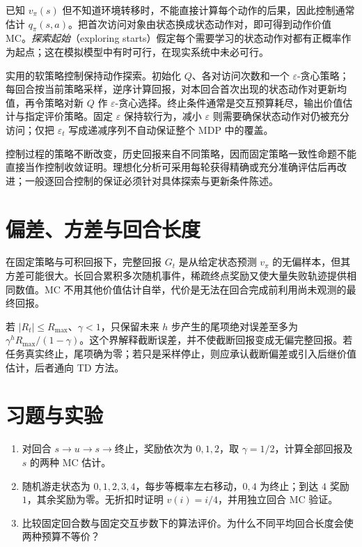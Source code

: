 已知 $v_\pi(s)$ 但不知道环境转移时，不能直接计算每个动作的后果，因此控制通常估计 $q_\pi(s,a)$。把首次访问对象由状态换成状态动作对，即可得到动作价值 MC。\emph{探索起始}（exploring starts）假定每个需要学习的状态动作对都有正概率作为起点；这在模拟模型中有时可行，在现实系统中未必可行。

实用的软策略控制保持动作探索。初始化 $Q$、各对访问次数和一个 $\varepsilon$-贪心策略；每回合按当前策略采样，逆序计算回报，对本回合首次出现的状态动作对更新均值，再令策略对新 $Q$ 作 $\varepsilon$-贪心选择。终止条件通常是交互预算耗尽，输出价值估计与指定评价策略。固定 $\varepsilon$ 保持软行为，减小 $\varepsilon$ 则需要确保状态动作对仍被充分访问；仅把 $\varepsilon_t$ 写成递减序列不自动保证整个 MDP 中的覆盖。

控制过程的策略不断改变，历史回报来自不同策略，因而固定策略一致性命题不能直接当作控制收敛证明。理想化分析可采用每轮获得精确或充分准确评估后再改进；一般逐回合控制的保证必须针对具体探索与更新条件陈述。

\section{偏差、方差与回合长度}

在固定策略与可积回报下，完整回报 $G_t$ 是从给定状态预测 $v_\pi$ 的无偏样本，但其方差可能很大。长回合累积多次随机事件，稀疏终点奖励又使大量失败轨迹提供相同数值。MC 不用其他价值估计自举，代价是无法在回合完成前利用尚未观测的最终回报。

若 $|R_t|\leq R_{\max}$、$\gamma<1$，只保留未来 $h$ 步产生的尾项绝对误差至多为 $\gamma^hR_{\max}/(1-\gamma)$。这个界解释截断误差，并不使截断回报变成无偏完整回报。若任务真实终止，尾项确为零；若只是采样停止，则应承认截断偏差或引入后继价值估计，后者通向 TD 方法。

\section{习题与实验}
\begin{enumerate}
\item 对回合 $s\to u\to s\to\text{终止}$，奖励依次为 $0,1,2$，取 $\gamma=1/2$，计算全部回报及 $s$ 的两种 MC 估计。
\item 随机游走状态为 $0,1,2,3,4$，每步等概率左右移动，$0,4$ 为终止；到达 $4$ 奖励 $1$，其余奖励为零。无折扣时证明 $v(i)=i/4$，并用独立回合 MC 验证。
\item 比较固定回合数与固定交互步数下的算法评价。为什么不同平均回合长度会使两种预算不等价？
\end{enumerate}





